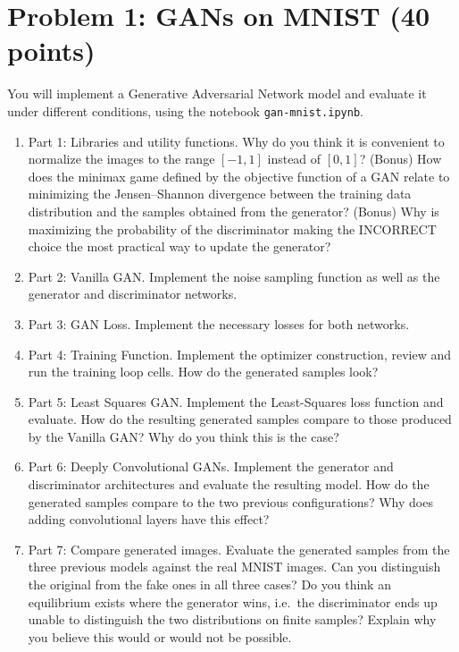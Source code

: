 \section{Problem 1: GANs on MNIST (40 points)}

\begin{question}
You will implement a Generative Adversarial Network model and evaluate it under different conditions, using the notebook \texttt{gan-mnist.ipynb}.
\begin{enumerate}
  \item[(a)] Part 1: Libraries and utility functions. Why do you think it is convenient to normalize the images to the range \([-1,1]\) instead of \([0,1]\)?
  (Bonus) How does the minimax game defined by the objective function of a GAN relate to minimizing the Jensen--Shannon divergence between the training data distribution and the samples obtained from the generator? (Bonus) Why is maximizing the probability of the discriminator making the INCORRECT choice the most practical way to update the generator?
  \item[(b)] Part 2: Vanilla GAN. Implement the noise sampling function as well as the generator and discriminator networks.
  \item[(c)] Part 3: GAN Loss. Implement the necessary losses for both networks.
  \item[(d)] Part 4: Training Function. Implement the optimizer construction, review and run the training loop cells. How do the generated samples look?
  \item[(e)] Part 5: Least Squares GAN. Implement the Least-Squares loss function and evaluate. How do the resulting generated samples compare to those produced by the Vanilla GAN? Why do you think this is the case?
  \item[(f)] Part 6: Deeply Convolutional GANs. Implement the generator and discriminator architectures and evaluate the resulting model. How do the generated samples compare to the two previous configurations? Why does adding convolutional layers have this effect?
  \item[(g)] Part 7: Compare generated images. Evaluate the generated samples from the three previous models against the real MNIST images. Can you distinguish the original from the fake ones in all three cases? Do you think an equilibrium exists where the generator wins, i.e.\ the discriminator ends up unable to distinguish the two distributions on finite samples? Explain why you believe this would or would not be possible.
\end{enumerate}
\end{question}


